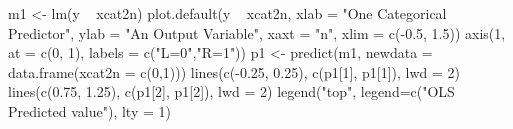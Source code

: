 \begin{Schunk}
\begin{Sinput}
 m1 <- lm(y ~ xcat2n)
 plot.default(y ~ xcat2n, xlab = "One Categorical Predictor", ylab = "An Output Variable", xaxt = "n", xlim = c(-0.5, 1.5))
 axis(1, at = c(0, 1), labels = c("L=0","R=1"))
 p1 <- predict(m1, newdata = data.frame(xcat2n = c(0,1)))
 lines(c(-0.25, 0.25), c(p1[1], p1[1]), lwd = 2)
 lines(c(0.75, 1.25), c(p1[2], p1[2]), lwd = 2)
 legend("top", legend=c("OLS Predicted value"), lty = 1)
\end{Sinput}
\end{Schunk}
